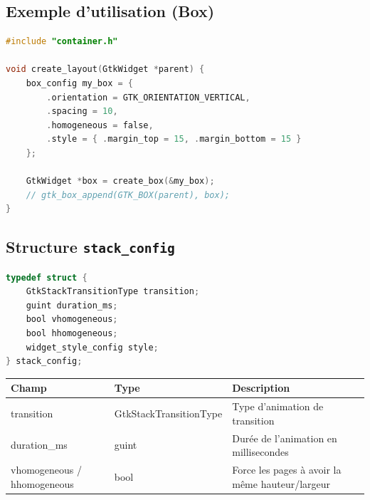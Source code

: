 \subsection{Exemple d'utilisation (Box)}

\begin{lstlisting}[language=C]
#include "container.h"

void create_layout(GtkWidget *parent) {
    box_config my_box = {
        .orientation = GTK_ORIENTATION_VERTICAL,
        .spacing = 10,
        .homogeneous = false,
        .style = { .margin_top = 15, .margin_bottom = 15 }
    };
    
    GtkWidget *box = create_box(&my_box);
    // gtk_box_append(GTK_BOX(parent), box);
}
\end{lstlisting}
\subsection{Structure \texttt{stack\_config}}
\begin{lstlisting}[language=C]
typedef struct {
    GtkStackTransitionType transition;
    guint duration_ms;
    bool vhomogeneous;
    bool hhomogeneous;
    widget_style_config style;
} stack_config;
\end{lstlisting}
\begin{center}
\begin{tabular}{|l|l|>{\raggedright\arraybackslash}p{6cm}|}
\hline
\textbf{Champ} & \textbf{Type} & \textbf{Description} \\
\hline
transition & GtkStackTransitionType & Type d'animation de transition \\
\hline
duration\_ms & guint & Durée de l'animation en millisecondes \\
\hline
vhomogeneous / hhomogeneous & bool & Force les pages à avoir la même hauteur/largeur \\
\hline
\end{tabular}
\end{center}